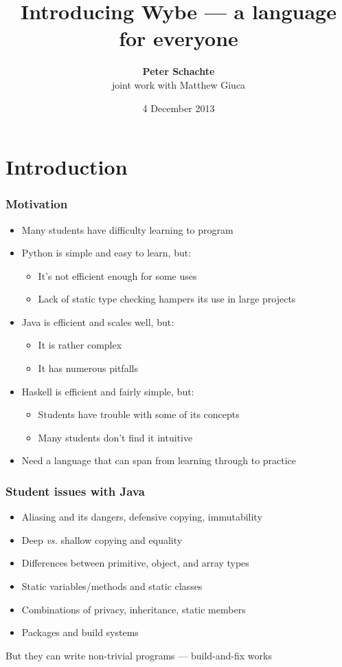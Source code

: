 \documentclass[12pt]{beamer}
\title[Introducing Wybe]{Introducing Wybe --- a language for everyone}
\author[Peter Schachte]
{\textbf{Peter Schachte}  \\
  \small joint work with Matthew Giuca}
\institute[Melbourne]{The University of Melbourne \\ Department of
  Computing and Information Systems}
\date{4 December 2013}
\begin{document}
\frame{\titlepage}

\section{Introduction}

\begin{frame}[fragile]
\frametitle{Motivation}
\begin{itemize}
\item Many students have difficulty learning to program
\item Python is simple and easy to learn, but:
  \begin{itemize}
  \item It's not efficient enough for some uses
  \item Lack of static type checking hampers its use in large projects
  \end{itemize}
\item Java is efficient and scales well, but:
  \begin{itemize}
  \item It is rather complex
  \item It has numerous pitfalls
  \end{itemize}
\item Haskell is efficient and fairly simple, but:
  \begin{itemize}
  \item Students have trouble with some of its concepts
  \item Many students don't find it intuitive
  \end{itemize}
\item Need a language that can span from learning through to practice
\end{itemize}
\end{frame}

\begin{frame}[fragile]
\frametitle{Student issues with Java}
\begin{itemize}
\item Aliasing and its dangers, defensive copying, immutability
\item Deep \emph{vs.} shallow copying and equality
\item Differences between primitive, object, and array types
\item Static variables/methods and static classes
\item Combinations of privacy, inheritance, static members
\item Packages and build systems
\end{itemize}

But they can write non-trivial programs --- build-and-fix works

\end{frame}
\end{document}

